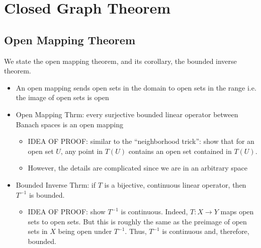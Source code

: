 \documentclass{article}
\theoremstyle{plain}
\theoremstyle{definition}
\begin{document}
		\section{Closed Graph Theorem} 

		\subsection{Open Mapping Theorem} 
		We state the open mapping theorem, and its corollary, the bounded inverse theorem. 
		\begin{itemize}
				\item An open mapping sends open sets in the domain to open sets in the range i.e. the image of open sets is open 
				\item Open Mapping Thrm: every surjective bounded linear operator between Banach spaces is an open mapping 
						\begin{itemize}
								\item IDEA OF PROOF: similar to the ``neighborhood trick'': show that for an open set $U$, any point in $T(U)$ contains an open set contained in $T(U)$. 
								\item However, the details are complicated since we are in an arbitrary space 
						\end{itemize}
				\item Bounded Inverse Thrm: if $T$ is a bijective, continuous linear operator, then $T^{-1}$ is bounded. 
						\begin{itemize}
								\item IDEA OF PROOF: show $T^{-1}$ is continuous. Indeed, $T: X\to Y$ maps open sets to open sets. But this is roughly the same as the preimage of open sets in $X$ being open under $T^{-1}$. Thus, $T^{-1}$ is continuous and, therefore, bounded. 
						\end{itemize}
		\end{itemize}
\end{document}
